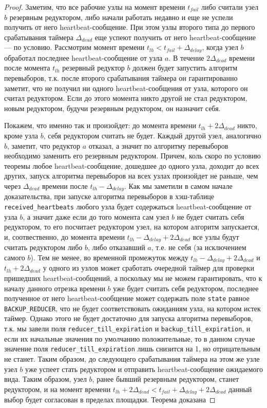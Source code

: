 \documentclass{article}
\theoremstyle{plain}
\theoremstyle{plain}
\theoremstyle{plain}
\theoremstyle{plain}
\theoremstyle{definition}
\theoremstyle{remark}
\theoremstyle{plain}
\begin{document}
\begin{proof}
    Заметим, что все рабочие узлы на момент времени $t_{fail}$ либо считали узел $b$ резервным редуктором, либо начали работать недавно и еще не успели получить от него heartbeat-сообщение. При этом узлы второго типа до первого срабатывания таймера $\Delta_{dead}$ еще успеют получить от него heartbeat-сообщение --- по условию. Рассмотрим момент времени $t_{lh} < t_{fail} + \Delta_{delay}$, когда узел $b$ обработал последнее heartbeat-сообщение от узла $a$. В течение $2\Delta_{dead}$ времени после момента $t_{lh}$ резервный редуктор $b$ должен будет запустить алгоритм перевыборов, т.к. после второго срабатывания таймера он гарантированно заметит, что не получил ни одного heartbeat-сообщения от узла, которого он считал редуктором. Если до этого момента никто другой не стал редуктором, новым редуктором, будучи резервным редуктором, он назначит себя.
    
    Покажем, что именно так и произойдет: до момента времени $t_{lh} + 2\Delta_{dead}$ никто, кроме узла $b$, себя редуктором считать не будет. Каждый другой узел, аналогично $b$, заметит, что редуктор $a$ отказал, а значит по алгоритму перевыборов необходимо заменить его резервным редуктором. Причем, коль скоро по условию теоремы любое heartbeat-сообщение, дошедшее до одного узла, доходит до всех других, запуск алгоритма перевыборов на всех узлах произойдет не раньше, чем через $\Delta_{dead}$ времени после $t_{lh} - \Delta_{delay}$. Как мы заметили в самом начале доказательства, при запуске алгоритма перевыборов в хэш-таблице \texttt{received\_heartbeats} любого узла будет содержаться heartbeat-сообщение от узла $b$, а значит даже если до того момента сам узел $b$ не будет считать себя редуктором, то его посчитает редуктором узел, на котором алгоритм запускается, и, соотвественно, до момента времени $t_{lh} - \Delta_{delay} + 2\Delta_{dead}$ все узлы будут считать редуктором либо $b$, либо отказавший $a$, т.е. не себя (за исключением самого $b$). Тем не менее, во временной промежуток между $t_{lh} - \Delta_{delay} + 2\Delta_{dead}$ и $t_{lh} + 2\Delta_{dead}$ у одного из узлов может сработать очередной таймер для проверки пришедших heartbeat-сообщений, а поскольку мы не можем гарантировать, что к началу данного отрезка времени $b$ уже будет считать себя редуктором, последнее полученное от него heartbeat-сообщение может содержать поле \texttt{state} равное \texttt{BACKUP\_REDUCER}, что не будет соответствовать ожиданиям узла, на котором истек таймер. Однако этого не будет достаточно для запуска алгоритма перевыборов, т.к. мы завели поля \texttt{reducer\_till\_expiration} и \texttt{backup\_till\_expiration}, и если их начальные значения по умолчанию положительные, то в данном случае значение поля \texttt{reducer\_till\_expiration} лишь снизится на 1, но отрицательным не станет. Таким образом, до следующего срабатывания таймера на этом же узле узел $b$ уже успеет стать редуктором и отправить heartbeat-сообщение ожидаемого вида. Таким образом, узел $b$, ранее бывший резервным редуктором, станет редуктором, и на момент времени $t_{lh} + 2\Delta_{dead} < t_{fail} + \Delta_{delay} + 2\Delta_{dead}$ данный выбор будет согласован в пределах площадки. Теорема доказана
\end{proof}
\end{document}
